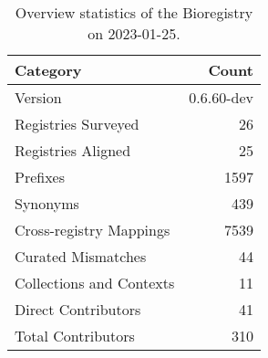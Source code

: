 \begin{table}
\centering
\caption{Overview statistics of the Bioregistry on 2023-01-25.}
\label{tab:bioregistry-summary}
\begin{tabular}{lr}
\toprule
                Category &      Count \\
\midrule
                 Version & 0.6.60-dev \\
     Registries Surveyed &         26 \\
      Registries Aligned &         25 \\
                Prefixes &       1597 \\
                Synonyms &        439 \\
 Cross-registry Mappings &       7539 \\
      Curated Mismatches &         44 \\
Collections and Contexts &         11 \\
     Direct Contributors &         41 \\
      Total Contributors &        310 \\
\bottomrule
\end{tabular}
\end{table}
